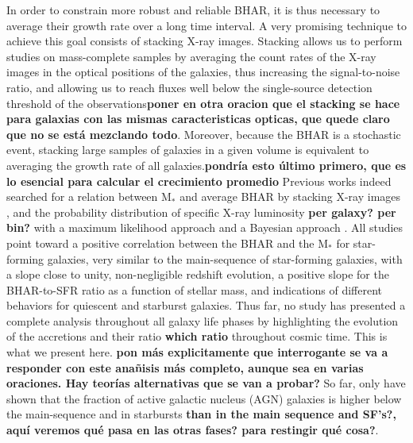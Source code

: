     In order to constrain more robust and reliable BHAR, 
    it is thus necessary to average their growth rate over a long time interval. A very promising technique to achieve this goal consists of stacking X-ray images. 
    Stacking allows us to perform studies on mass-complete samples by averaging the count rates of the X-ray images in the optical positions of the galaxies, thus increasing the signal-to-noise ratio, and allowing us to reach fluxes well below the single-source detection threshold of the observations{\bf poner en otra oracion que el stacking se hace para galaxias con las mismas caracteristicas opticas, que quede claro que no se está mezclando todo}. Moreover, because the BHAR is a stochastic event, stacking large samples of galaxies in a given volume is equivalent to averaging the growth rate of all galaxies.{\bf pondría esto último primero, que es lo esencial para calcular el crecimiento promedio}
    Previous works indeed searched for a relation between M$_*$ and average BHAR by stacking X-ray images \citep[e.g.,][]{2012ApJ...753L..30M, 2015ApJ...800L..10R, 2017ApJ...842...72Y}, and the probability distribution of specific X-ray luminosity {\bf per galaxy? per bin?} with a maximum likelihood approach \citep{2012ApJ...746...90A, 2012MNRAS.427.3103B, 2018MNRAS.475.1887Y} and a Bayesian approach \citep{2018MNRAS.474.1225A}. All studies point toward a positive correlation between the BHAR and the M$_*$ for star-forming galaxies, very similar to the main-sequence of star-forming galaxies, with a slope close to unity, non-negligible redshift evolution, a positive slope for the BHAR-to-SFR ratio as a function of stellar mass, and indications of different behaviors for quiescent and starburst galaxies. 
    Thus far, no study has presented a complete analysis throughout all galaxy life phases by highlighting the evolution of the accretions and their ratio {\bf which ratio} throughout cosmic time. This is what we present here. {\bf pon más explicitamente que interrogante se va a responder con este anañisis más completo, aunque sea en varias oraciones. Hay teorías alternativas que se van a probar?} So far, only \citet{2019MNRAS.484.4360A} have shown that the fraction of active galactic nucleus (AGN) galaxies is higher below the main-sequence and in starbursts {\bf than in the main sequence and SF's?, aquí veremos qué pasa en las otras fases? para restingir qué cosa?}.
        
